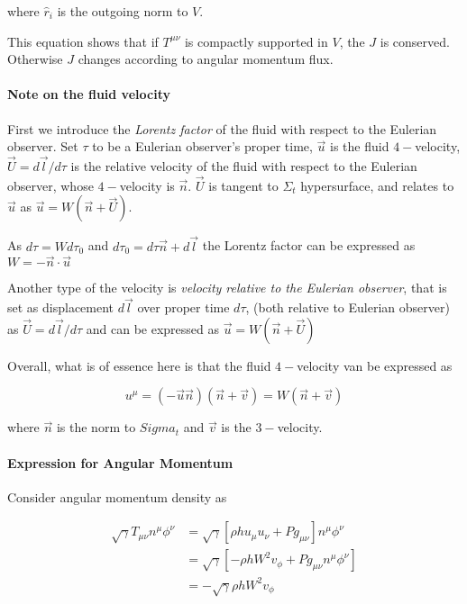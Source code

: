where $\hat{r}_i$ is the outgoing norm to $V$. 

This equation shows that if $T^{\mu\nu}$ is compactly supported in $V$, the $J$ is conserved. Otherwise $J$ changes according to angular momentum flux. 

\paragraph{Note on the fluid velocity} 

First we introduce the \textit{Lorentz factor} of the fluid with respect to the Eulerian observer. Set $\tau$ to be a Eulerian observer's proper time, $\Vec{u}$ is the fluid $4-$velocity, $\Vec{U}=d\Vec{l}/d\tau$ is the relative velocity of the fluid with respect to the Eulerian observer, whose $4-$velocity is $\Vec{n}$. $\Vec{U}$ is tangent to $\Sigma_t$ hypersurface, and relates to $\Vec{u}$ as $\Vec{u} = W(\Vec{n} + \Vec{U})$.

As $d\tau = W d\tau_0$ and $d\tau_0 = d\tau \Vec{n} + d\Vec{l}$ the Lorentz factor can be expressed as $W = -\Vec{n}\cdot\Vec{u}$ 

Another type of the velocity is \textit{velocity relative to the Eulerian observer}, that is set as displacement $d\Vec{l}$ over proper time $d\tau$, (both relative to Eulerian observer) as $\Vec{U} = d\Vec{l} / d\tau$ and can be expressed as $\Vec{u} = W (\Vec{n} + \Vec{U})$ 

Overall, what is of essence here is that the fluid $4-$velocity van be expressed as 

\begin{equation}
u^{\mu} = (-\Vec{u}\Vec{n})(\Vec{n}+\Vec{v}) = W(\Vec{n} + \vec{v})
\end{equation}

where $\Vec{n}$ is the norm to $Sigma_t$ and $\Vec{v}$ is the $3-$velocity.

\paragraph{Expression for Angular Momentum} 

Consider angular momentum density as 

\begin{align}
\sqrt{\gamma}T_{\mu\nu}n^{\mu}\phi^{\nu} &= \sqrt{\gamma}[\rho h u_{\mu} u_{\nu} + Pg_{\mu\nu}]n^{\mu}\phi^{\nu} \\
&= \sqrt{\gamma}[-\rho h W^2 v_{\phi} + Pg_{\mu\nu}n^{\mu}\phi^{\nu}] \\ 
&= -\sqrt{\gamma}\rho h W^2 v_{\phi}
\end{align}

